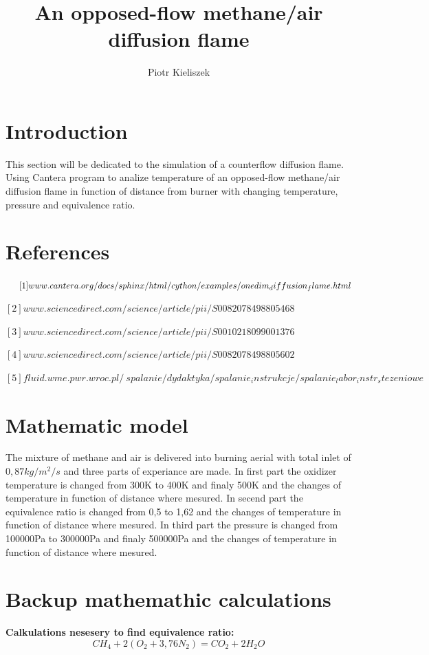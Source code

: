 \documentclass[a4paper]{article}
\title{An opposed-flow methane/air diffusion flame}
\author{Piotr Kieliszek}
\begin{document}
\maketitle



\section{Introduction}

This section will be dedicated to the simulation of a counterflow diffusion flame. Using Cantera program to analize temperature of an opposed-flow methane/air diffusion flame in function of distance from burner with changing temperature, pressure and equivalence ratio.

\section{References}

$
\hspace{5,35mm}[1] www.cantera.org/docs/sphinx/html/cython/examples/onedim_diffusion_flame.html
$

$
[2] www.sciencedirect.com/science/article/pii/S0082078498805468
$

$
[3] www.sciencedirect.com/science/article/pii/S0010218099001376
$

$
[4] www.sciencedirect.com/science/article/pii/S0082078498805602
$

$
[5] fluid.wme.pwr.wroc.pl/~spalanie/dydaktyka/spalanie_instrukcje/spalanie_labor_instr_stezeniowe
$

\section{Mathematic model}

The mixture of methane and air is delivered into burning aerial with total inlet of $0,87kg/m^2/s$ and three parts of experiance are made. In first part the oxidizer temperature is changed from 300K to 400K and finaly 500K and the changes of temperature in function of distance where mesured. In secend part the equivalence ratio is changed from 0,5 to 1,62 and the changes of temperature in function of distance where mesured. In third part the pressure is changed from 100000Pa to 300000Pa and finaly 500000Pa and the changes of temperature in function of distance where mesured.

\section{Backup mathemathic calculations}
\textbf{Calkulations nesesery to find equivalence ratio:}
\[{CH_4 +2(O_2+3,76N_2) }
      = {CO_2+2H_2 O}\] 
\end{document}
